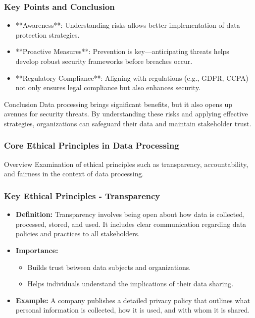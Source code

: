 \documentclass[aspectratio=169]{beamer}
\begin{document}
\begin{frame}[fragile]
    \frametitle{Key Points and Conclusion}
    \begin{itemize}
        \item **Awareness**: Understanding risks allows better implementation of data protection strategies.
        \item **Proactive Measures**: Prevention is key—anticipating threats helps develop robust security frameworks before breaches occur.
        \item **Regulatory Compliance**: Aligning with regulations (e.g., GDPR, CCPA) not only ensures legal compliance but also enhances security.
    \end{itemize}
    \begin{block}{Conclusion}
        Data processing brings significant benefits, but it also opens up avenues for security threats. By understanding these risks and applying effective strategies, organizations can safeguard their data and maintain stakeholder trust.
    \end{block}
\end{frame}

\begin{frame}[fragile]
  \frametitle{Core Ethical Principles in Data Processing}
  \begin{block}{Overview}
    Examination of ethical principles such as transparency, accountability, and fairness in the context of data processing.
  \end{block}
\end{frame}

\begin{frame}[fragile]
  \frametitle{Key Ethical Principles - Transparency}
  \begin{itemize}
    \item \textbf{Definition:} Transparency involves being open about how data is collected, processed, stored, and used. It includes clear communication regarding data policies and practices to all stakeholders.
    \item \textbf{Importance:} 
      \begin{itemize}
        \item Builds trust between data subjects and organizations.
        \item Helps individuals understand the implications of their data sharing.
      \end{itemize}
    \item \textbf{Example:} A company publishes a detailed privacy policy that outlines what personal information is collected, how it is used, and with whom it is shared.
  \end{itemize}
\end{frame}
\end{document}
